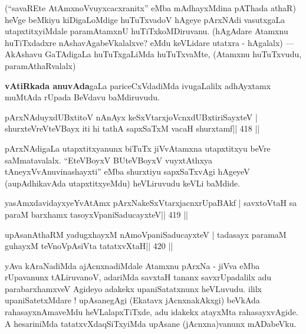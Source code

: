 \begin{artha}
(``savaREte AtAmxnoVvuyxcacxranitx'' eMba mAdhayxMdina pAThada athaR) 
heVge beMkiyu kiDigaLoMdige huTuTxvadoV hAgeye pArxNAdi vasutxgaLa 
utapxtitxyiMdale paramAtamxnU huTiTxkoMDiruvanu. (hAgAdare Atamxnu 
huTiTxdadxre nAshavAgabeVkalalxve? eMdu keVLidare utatxra - hAgalalx)  {\rm ---}  AkAshavu GaTAdigaLa huTuTxgaLiMda huTuTxvaMte, (Atamxnu huTuTxvudu, paramAthaRvalalx)
\end{artha}

\begin{artha}
{\bf vAtiRkada anuvAda}gaLa pariceCxVdadiMda ivugaLalilx adhAyxtamx muMtAda rUpada BeVdavu baMdiruvudu.
\end{artha}


\begin{shl}
pArxNAduyxdUBxtitoV nAnAyx keSxVtarxjoVcnxdUBxtiriSayxteV |
shurxteVreVteVBayx iti hi tathA sapxSaTxM vacaH shurxtamf\hfill || 418 ||
\end{shl}

\begin{artha}
pArxNAdigaLa utapxtitxyanunx biTuTx jiVvAtamxna utapxtitxyu beVre  saMmatavalalx. ``EteVBoyxV BUteVBoyxV vuyxtAthxya tAneyxVvAnuvinashayxti'' eMba shurxtiyu sapxSaTxvAgi hAgeyeV (aupAdhikavAda utapxtitxyeMdu) heVLiruvudu keVLi baMdide.
\end{artha}


\begin{shl}
yasAmxdavidayxyeYvA\s\s tAmx pArxNakeSxVtarxjacnxrUpaBAkf |
savxtoV\s taH sa paraM barxhamx tasoyxVpaniSaducayxteV\hfill || 419 ||
\end{shl}

\begin{shl}
upAsanAthaRM yadugxhayxM nAmoVpaniSaducayxteV |
tadasayx paramaM guhayxM teVnoVpAsiVta tatatxvXtaH\hfill || 420 ||
\end{shl}

\begin{artha}
yAva kAraNadiMda ajAcnxnadiMdale Atamxnu pArxNa - jiVva eMba   rUpavanunx tALiruvanoV, adariMda savxtaH tananx savxrUpadalilx adu  parabarxhamxveV Agideyo adakekx upaniSatatxnunx heVLuvudu. ililx  upaniSatetxMdare ! upAsanegAgi (Ekatavx jAcnxnakAkxgi) beVkAda rahasayxnAmaveMdu heVLalapxTiTxde, adu idakekx atayxMta rahasayxvAgide. A  hesariniMda tatatxvXdaqSiTxyiMda upAsane (jAcnxna)vanunx mADabeVku.
\end{artha}



